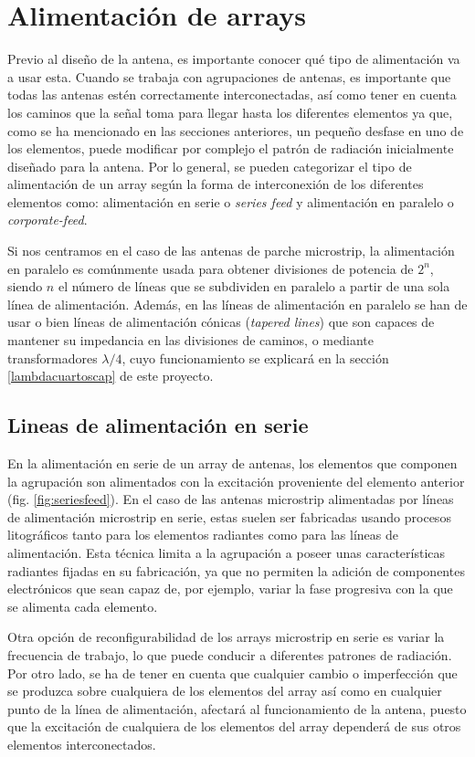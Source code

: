 \section{Alimentación de arrays}
\par Previo al diseño de la antena, es importante conocer qué tipo de alimentación va a usar esta. Cuando se trabaja con agrupaciones de antenas, es importante que todas las antenas estén correctamente interconectadas, así como tener en cuenta los caminos que la señal toma para llegar hasta los diferentes elementos ya que, como se ha mencionado en las secciones anteriores, un pequeño desfase en uno de los elementos, puede modificar por complejo el patrón de radiación inicialmente diseñado para la antena. Por lo general, se pueden categorizar el tipo de alimentación de un array según la forma de interconexión de los diferentes elementos como: alimentación en serie o \textit{series feed} y alimentación en paralelo o \textit{corporate-feed}. 
\\
\par Si nos centramos en el caso de las antenas de parche microstrip, la alimentación en paralelo es comúnmente usada para obtener divisiones de potencia de $2^{n}$, siendo $n$ el número de líneas que se subdividen en paralelo a partir de una sola línea de alimentación. Además, en las líneas de alimentación en paralelo se han de usar o bien líneas de alimentación cónicas (\textit{tapered lines}) que son capaces de mantener su impedancia en las divisiones de caminos, o mediante transformadores $\lambda/4$, cuyo funcionamiento se explicará en la sección \ref{lambdacuartoscap} de este proyecto. \cite{Balanis2015}

\subsection{Lineas de alimentación en serie}
\par En la alimentación en serie de un array de antenas, los elementos  que componen la agrupación son alimentados con la excitación proveniente del elemento anterior (fig. \ref{fig:seriesfeed}). En el caso de las antenas microstrip alimentadas por líneas de alimentación microstrip en serie, estas suelen ser fabricadas usando procesos litográficos tanto para los elementos radiantes como para las líneas de alimentación. Esta técnica limita a la agrupación a poseer unas características radiantes fijadas en su fabricación, ya que no permiten la adición de componentes electrónicos que sean capaz de, por ejemplo, variar la fase progresiva con la que se alimenta cada elemento. \cite{Balanis2015}
\\
\par Otra opción de reconfigurabilidad de los arrays microstrip en serie es variar la frecuencia de trabajo, lo que puede conducir a diferentes patrones de radiación. Por otro lado, se ha de tener en cuenta que cualquier cambio o imperfección que se produzca sobre cualquiera de los elementos del array así como en cualquier punto de la línea de alimentación, afectará al funcionamiento de la antena, puesto que la excitación de cualquiera de los elementos del array dependerá de sus otros elementos interconectados.
